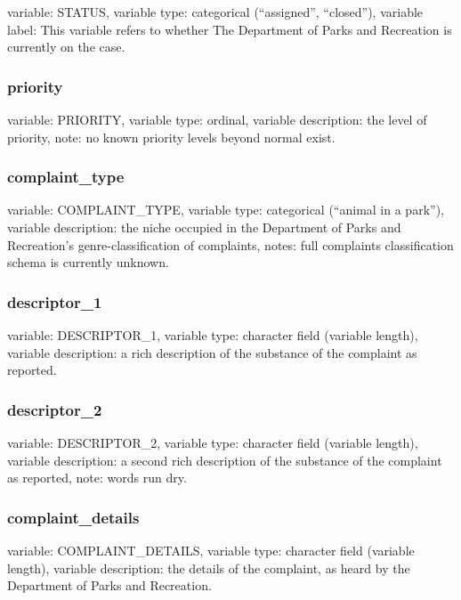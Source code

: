 \documentclass[]{article}
\begin{document}
variable: STATUS, variable type: categorical (``assigned'', ``closed''),
variable label: This variable refers to whether The Department of Parks
and Recreation is currently on the case.

\subsubsection{priority}\label{priority}

variable: PRIORITY, variable type: ordinal, variable description: the
level of priority, note: no known priority levels beyond normal exist.

\subsubsection{complaint\_type}\label{complaintux5ftype}

variable: COMPLAINT\_TYPE, variable type: categorical (``animal in a
park''), variable description: the niche occupied in the Department of
Parks and Recreation's genre-classification of complaints, notes: full
complaints classification schema is currently unknown.

\subsubsection{descriptor\_1}\label{descriptorux5f1}

variable: DESCRIPTOR\_1, variable type: character field (variable
length), variable description: a rich description of the substance of
the complaint as reported.

\subsubsection{descriptor\_2}\label{descriptorux5f2}

variable: DESCRIPTOR\_2, variable type: character field (variable
length), variable description: a second rich description of the
substance of the complaint as reported, note: words run dry.

\subsubsection{complaint\_details}\label{complaintux5fdetails}

variable: COMPLAINT\_DETAILS, variable type: character field (variable
length), variable description: the details of the complaint, as heard by
the Department of Parks and Recreation.
\end{document}
